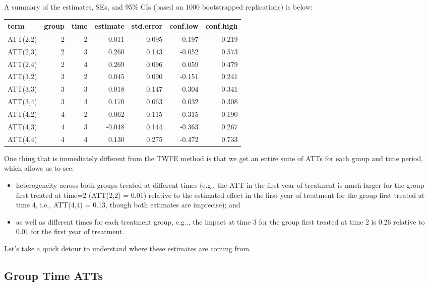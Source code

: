 \documentclass[
]{article}
\providecommand{\tightlist}{%
  \setlength{\itemsep}{0pt}\setlength{\parskip}{0pt}}
\begin{document}
A summary of the estimates, SEs, and 95\% CIs (based on 1000
bootstrapped replications) is below:

\begin{table}
\centering
\begin{tabular}[t]{l|r|r|r|r|r|r}
\hline
term & group & time & estimate & std.error & conf.low & conf.high\\
\hline
ATT(2,2) & 2 & 2 & 0.011 & 0.095 & -0.197 & 0.219\\
\hline
ATT(2,3) & 2 & 3 & 0.260 & 0.143 & -0.052 & 0.573\\
\hline
ATT(2,4) & 2 & 4 & 0.269 & 0.096 & 0.059 & 0.479\\
\hline
ATT(3,2) & 3 & 2 & 0.045 & 0.090 & -0.151 & 0.241\\
\hline
ATT(3,3) & 3 & 3 & 0.018 & 0.147 & -0.304 & 0.341\\
\hline
ATT(3,4) & 3 & 4 & 0.170 & 0.063 & 0.032 & 0.308\\
\hline
ATT(4,2) & 4 & 2 & -0.062 & 0.115 & -0.315 & 0.190\\
\hline
ATT(4,3) & 4 & 3 & -0.048 & 0.144 & -0.363 & 0.267\\
\hline
ATT(4,4) & 4 & 4 & 0.130 & 0.275 & -0.472 & 0.733\\
\hline
\end{tabular}
\end{table}

One thing that is immediately different from the TWFE method is that we
get an entire suite of ATTs for each group and time period, which allows
us to see:

\begin{itemize}
\tightlist
\item
  heterogeneity across both groups treated at different times (e.g., the
  ATT in the first year of treatment is much larger for the group first
  treated at time=2 (ATT(2,2) = 0.01) relative to the estimated effect
  in the first year of treatment for the group first treated at time 4,
  i.e., ATT(4,4) = 0.13, though both estimates are imprecise); and
\item
  as well as different times for each treatment group, e.g.., the impact
  at time 3 for the group first treated at time 2 is 0.26 relative to
  0.01 for the first year of treatment.
\end{itemize}

Let's take a quick detour to understand where these estimates are coming
from.

\hypertarget{group-time-atts}{%
\subsection{Group Time ATTs}\label{group-time-atts}}
\end{document}
